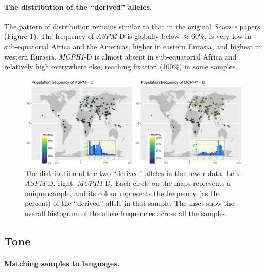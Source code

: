 \documentclass[twoside,onecolumn]{article}
\begin{document}
\paragraph{The distribution of the ``derived'' alleles.}

The pattern of distribution remains similar to that in the original \textit{Science} papers (Figure \ref{Fig:gene_maps}).
The frequency of \textit{ASPM}-D is globally below $\approx 60\%$, is very low in sub-equatorial Africa and the Americas, higher in eastern Eurasia, and highest in western Eurasia.
\textit{MCPH1}-D is almost absent in sub-equatorial Africa and relatively high everywhere else, reaching fixation (100\%) in some samples.

\begin{figure}[h]
  \centering
	\includegraphics[width=\textwidth]{../../code/figures/map_genes}
	\caption{The distribution of the two ``derived'' alleles in the newer data, Left: \textit{ASPM}-D, right: \textit{MCPH1}-D. Each circle on the maps represents a unique sample, and its colour represents the frequency (as the percent) of the ``derived'' allele in that sample. The inset show the overall histogram of the allele frequencies across all the samples.}
	\label{Fig:gene_maps}
\end{figure}


\subsection{Tone}

\paragraph{Matching samples to languages.}
\end{document}
